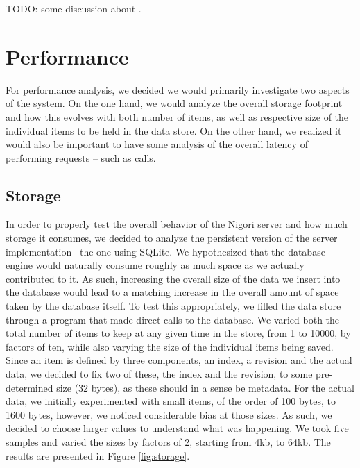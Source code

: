 TODO: some discussion about .

\section{Performance}
For performance analysis, we decided we would primarily investigate two aspects of the system.
On the one hand, we would analyze the overall storage footprint and how this evolves with both number of items, as well as respective size of the individual items to be held in the data store.
On the other hand, we realized it would also be important to have some analysis of the overall latency of performing requests -- such as  calls.

\subsection{Storage}
In order to properly test the overall behavior of the Nigori server and how much storage it consumes, we decided to analyze the persistent version of the server implementation-- the one using SQLite.
We hypothesized that the database engine would naturally consume roughly as much space as we actually contributed to it.
As such, increasing the overall size of the data we insert into the database would lead to a matching increase in the overall amount of space taken by the database itself.
To test this appropriately, we filled the data store through a program that made direct calls to the database.
We varied both the total number of items to keep at any given time in the store, from 1 to 10000, by factors of ten, while also varying the size of the individual items being saved.
Since an item is defined by three components, an index, a revision and the actual data, we decided to fix two of these, the index and the revision, to some pre-determined size (32 bytes), as these should in a sense be metadata.
For the actual data, we initially experimented with small items, of the order of 100 bytes, to 1600 bytes, however, we noticed considerable bias at those sizes.
As such, we decided to choose larger values to understand what was happening.
We took five samples and varied the sizes by factors of 2, starting from 4kb, to 64kb.
The results are presented in Figure \ref{fig:storage}.

